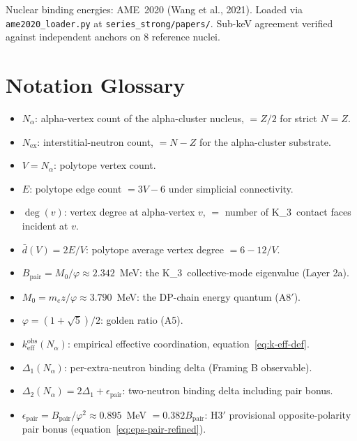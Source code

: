 \documentclass[11pt,letterpaper]{article}
\theoremstyle{definition}
\newcommand{\Mzero}{M_0}
\newcommand{\phig}{\varphi}
\newcommand{\Bpair}{B_{\text{pair}}}
\newcommand{\Nalpha}{N_\alpha}
\newcommand{\Nex}{N_{\text{ex}}}
\newcommand{\Kthree}{K_3}
\newcommand{\degv}{\deg(v)}
\begin{document}
Nuclear binding energies: AME~2020 (Wang et al., 2021). Loaded via \texttt{ame2020\_loader.py} at \texttt{series\_strong/papers/}. Sub-keV agreement verified against independent anchors on 8 reference nuclei.

\section{Notation Glossary}
\label{app:notation}

\begin{itemize}
  \item $\Nalpha$: alpha-vertex count of the alpha-cluster nucleus, $= Z/2$ for strict $N = Z$.
  \item $\Nex$: interstitial-neutron count, $= N - Z$ for the alpha-cluster substrate.
  \item $V = \Nalpha$: polytope vertex count.
  \item $E$: polytope edge count $= 3V - 6$ under simplicial connectivity.
  \item $\degv$: vertex degree at alpha-vertex $v$, $= $ number of \Kthree\ contact faces incident at $v$.
  \item $\bar{d}(V) = 2E/V$: polytope average vertex degree $= 6 - 12/V$.
  \item $\Bpair = \Mzero/\phig \approx 2.342$~MeV: the \Kthree\ collective-mode eigenvalue (Layer 2a).
  \item $\Mzero = m_e z/\phig \approx 3.790$~MeV: the DP-chain energy quantum (A8$'$).
  \item $\phig = (1 + \sqrt{5})/2$: golden ratio (A5).
  \item $k_{\text{eff}}^{\text{obs}}(\Nalpha)$: empirical effective coordination, equation~\eqref{eq:k-eff-def}.
  \item $\Delta_1(\Nalpha)$: per-extra-neutron binding delta (Framing B observable).
  \item $\Delta_2(\Nalpha) = 2\Delta_1 + \epsilon_{\text{pair}}$: two-neutron binding delta including pair bonus.
  \item $\epsilon_{\text{pair}} = \Bpair/\phig^2 \approx 0.895$~MeV $= 0.382\Bpair$: H3$'$ provisional opposite-polarity pair bonus (equation~\ref{eq:eps-pair-refined}).
\end{itemize}
\end{document}
